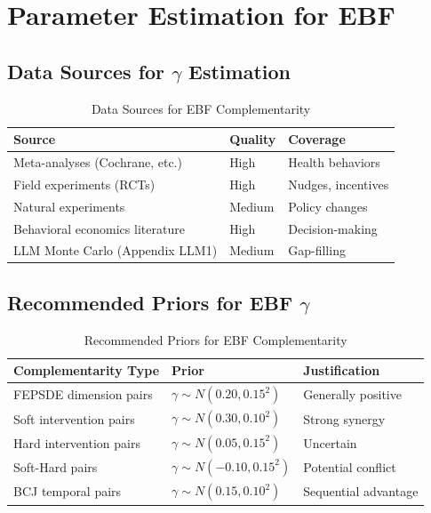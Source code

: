 \section{Parameter Estimation for EBF}
\label{sec:estimation}

\subsection{Data Sources for $\gamma$ Estimation}

\begin{table}[h]
\centering
\caption{Data Sources for EBF Complementarity}
\label{tab:data-sources}
\renewcommand{\arraystretch}{1.3}
\begin{tabular}{@{}lll@{}}
\toprule
\textbf{Source} & \textbf{Quality} & \textbf{Coverage} \\
\midrule
Meta-analyses (Cochrane, etc.) & High & Health behaviors \\
Field experiments (RCTs) & High & Nudges, incentives \\
Natural experiments & Medium & Policy changes \\
Behavioral economics literature & High & Decision-making \\
LLM Monte Carlo (Appendix LLM1) & Medium & Gap-filling \\
\bottomrule
\end{tabular}
\end{table}

\subsection{Recommended Priors for EBF $\gamma$}

\begin{table}[h]
\centering
\caption{Recommended Priors for EBF Complementarity}
\label{tab:ebf-priors}
\renewcommand{\arraystretch}{1.3}
\begin{tabular}{@{}lll@{}}
\toprule
\textbf{Complementarity Type} & \textbf{Prior} & \textbf{Justification} \\
\midrule
FEPSDE dimension pairs & $\gamma \sim N(0.20, 0.15^2)$ & Generally positive \\
Soft intervention pairs & $\gamma \sim N(0.30, 0.10^2)$ & Strong synergy \\
Hard intervention pairs & $\gamma \sim N(0.05, 0.15^2)$ & Uncertain \\
Soft-Hard pairs & $\gamma \sim N(-0.10, 0.15^2)$ & Potential conflict \\
BCJ temporal pairs & $\gamma \sim N(0.15, 0.10^2)$ & Sequential advantage \\
\bottomrule
\end{tabular}
\end{table}

